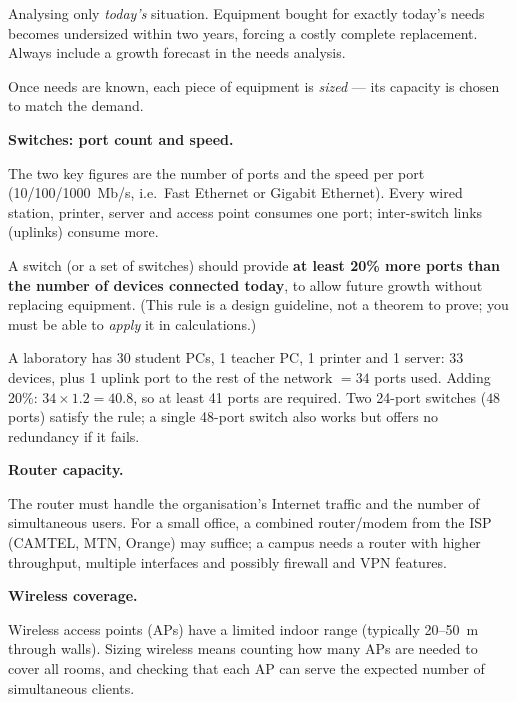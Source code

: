 \documentclass[11pt]{article}
\newcommand{\cle}[1]{{\popxbold\color{popdark}#1}}
\newcounter{popsec}
\newcounter{popsub}
\newcommand{\courssub}[1]{%
  \stepcounter{popsub}%
  \par\vspace{9pt}\noindent{\popxbold\fontsize{11.5}{13}\selectfont\color{popink}{\color{poporange}\thepopsec.\thepopsub}\hspace{6pt}#1}\par\nopagebreak\vspace{4pt}
}
\begin{document}
\begin{attention}
Analysing only \emph{today's} situation. Equipment bought for exactly today's needs becomes undersized within two years, forcing a costly complete replacement. Always include a growth forecast in the needs analysis.
\end{attention}

\courssub{Sizing the Equipment}

Once needs are known, each piece of equipment is \emph{sized} — its capacity is chosen to match the demand.

\textbf{Switches: port count and speed.}\par
The two key figures are the \cle{number of ports} and the \cle{speed per port} (10/100/1000~Mb/s, i.e.\ Fast Ethernet or Gigabit Ethernet). Every wired station, printer, server and access point consumes one port; inter-switch links (uplinks) consume more.

\begin{propriete}
A switch (or a set of switches) should provide \textbf{at least 20\% more ports than the number of devices connected today}, to allow future growth without replacing equipment. (This rule is a design guideline, not a theorem to prove; you must be able to \emph{apply} it in calculations.)
\end{propriete}

\begin{exemplebox}
A laboratory has 30 student PCs, 1 teacher PC, 1 printer and 1 server: 33 devices, plus 1 uplink port to the rest of the network $= 34$ ports used. Adding 20\%: $34 \times 1.2 = 40.8$, so at least 41 ports are required. Two 24-port switches ($48$ ports) satisfy the rule; a single 48-port switch also works but offers no redundancy if it fails.
\end{exemplebox}

\textbf{Router capacity.}\par
The router must handle the organisation's Internet traffic and the number of simultaneous users. For a small office, a combined router/modem from the ISP (CAMTEL, MTN, Orange) may suffice; a campus needs a router with higher throughput, multiple interfaces and possibly firewall and VPN features.

\textbf{Wireless coverage.}\par
Wireless access points (APs) have a limited indoor range (typically 20--50~m through walls). Sizing wireless means counting how many APs are needed to cover all rooms, and checking that each AP can serve the expected number of simultaneous clients.
\end{document}
